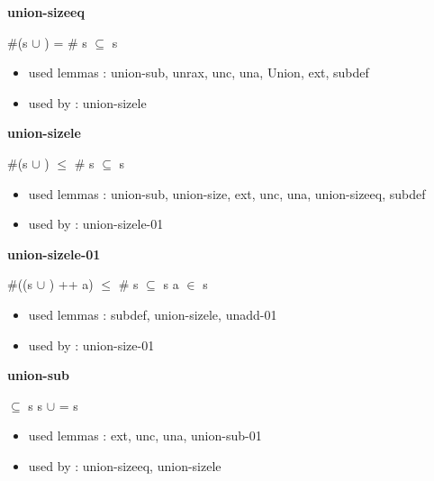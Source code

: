 \documentclass[a4paper]{article}
\begin{document}
{\large\bf union-sizeeq}

\medskip

 \Fol \#(s $\cup$ ) = \# s \Equiv {} $\subseteq$ s

\begin{itemize}


\item       used lemmas  : union-sub, unrax, unc, una, Union, ext, subdef
\item       used by      : union-sizele

\end{itemize}

\medskip

\bigskip

{\large\bf union-sizele}

\medskip

 \Fol \#(s $\cup$ ) $\le$ \# s \Equiv {} $\subseteq$ s

\begin{itemize}


\item       used lemmas  : union-sub, union-size, ext, unc, una, union-sizeeq, subdef
\item       used by      : union-sizele-01

\end{itemize}

\medskip

\bigskip

{\large\bf union-sizele-01}

\medskip

 \Fol \#((s $\cup$ ) ++ a) $\le$ \# s \Equiv {} $\subseteq$ s \And a $\in$ s

\begin{itemize}


\item       used lemmas  : subdef, union-sizele, unadd-01
\item       used by      : union-size-01

\end{itemize}

\medskip

\bigskip

{\large\bf union-sub}

\medskip

 \Fol {} $\subseteq$ s \Imp s $\cup$  = s

\begin{itemize}


\item       used lemmas  : ext, unc, una, union-sub-01
\item       used by      : union-sizeeq, union-sizele

\end{itemize}
\end{document}
